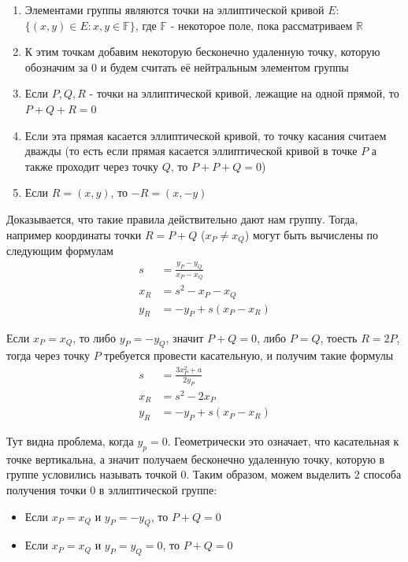 \begin{enumerate}
	\item Элементами группы являются точки на эллиптической кривой $E$: $\{(x, y) \in E : x, y \in \mathbb F\}$, где $\mathbb F$ - некоторое поле, пока рассматриваем $\mathbb R$
	\item К этим точкам добавим некоторую бесконечно удаленную точку, которую обозначим за $0$ и будем считать её нейтральным элементом группы
	\item Если $P, Q, R$ - точки на эллиптической кривой, лежащие на одной прямой, то $P+Q+R=0$
	\item Если эта прямая касается эллиптической кривой, то точку касания считаем дважды (то есть если прямая касается эллиптической кривой в точке $P$ а также проходит через точку $Q$, то $P+P+Q=0$)
	\item Если $R=(x, y)$, то $-R=(x, -y)$
\end{enumerate}

Доказывается, что такие правила действительно дают нам группу. Тогда, например координаты точки $R=P+Q$ ($x_P\neq x_Q$) могут быть вычислены по следующим формулам
%
\begin{align*}
	s &= \frac{y_P - y_Q}{x_P - x_Q} \\
	x_R &= s^2 - x_P - x_Q \\
	y_R &= -y_P + s(x_P - x_R)
\end{align*}

Если $x_P=x_Q$, то либо $y_P=-y_Q$, значит $P+Q=0$, либо $P=Q$, тоесть $R=2P$, тогда через точку $P$ требуется провести касательную, и получим такие формулы
%
\begin{align*}
	s &= \frac{3x_P^2+a}{2y_P} \\
	x_R &= s^2 - 2x_P \\
	y_R &= -y_P + s(x_P - x_R)
\end{align*}

Тут видна проблема, когда $y_p=0$. Геометрически это означает, что касательная к точке вертикальна, а значит получаем бесконечно удаленную точку, которую в группе условились называть точкой $0$. Таким образом, можем выделить 2 способа получения точки $0$ в эллиптической группе:

\begin{itemize}
	\item Если $x_P=x_Q$ и $y_P=-y_Q$, то $P+Q=0$
	\item Если $x_P=x_Q$ и $y_P=y_Q=0$, то $P+Q=0$
\end{itemize}


